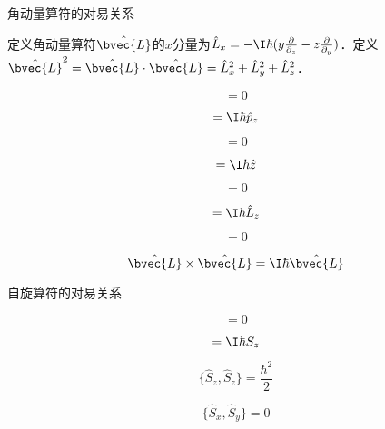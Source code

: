 \begin{theorem}{角动量算符的对易关系}\label{QMPrcp_the6}

定义角动量算符$\hat{\bvec{L}}$的$x$分量为$\hat{L}_x=-\I\hbar(y\frac{\partial}{\partial_z}-z\frac{\partial}{\partial _y})$．定义$\hat{\bvec{L}}^2=\hat{\bvec{L}}\cdot \hat{\bvec{L}}=\hat{L}_x^2+\hat{L}_y^2+\hat{L}_z^2$．

\begin{equation}
[\hat{p}_x, \hat{L}_x]=0
\end{equation}

\begin{equation}
[\hat{p}_x, \hat{L}_y]=\I\hbar\hat{p}_z
\end{equation}

\begin{equation}
[\hat{x}, \hat{L}_x]=0
\end{equation}

\begin{equation}
[\hat{x}, \hat{L}_y]=\I\hbar\hat{z}
\end{equation}

\begin{equation}
[\hat{L}_x, \hat{L}_x]=0
\end{equation}

\begin{equation}
[\hat{L}_x, \hat{L}_y]=\I\hbar\hat{L}_z
\end{equation}

\begin{equation}
[\hat{\bvec{L}}^2, \hat{L}_x]=0
\end{equation}

\begin{equation}
\hat{\bvec{L}}\times\hat{\bvec{L}}=\I\hbar \hat{\bvec{L}}
\end{equation}

\end{theorem}





\begin{theorem}{自旋算符的对易关系}

\begin{equation}
[\hat{S}_z, \hat{S}_z]=0
\end{equation}

\begin{equation}
[\hat{S}_x, \hat{S}_y]=\I\hbar S_z
\end{equation}

\begin{equation}
\{\hat{S}_z, \hat{S}_z\}=\frac{\hbar^2}{2}
\end{equation}

\begin{equation}
\{\hat{S}_x, \hat{S}_y\}=0
\end{equation}

\end{theorem}






